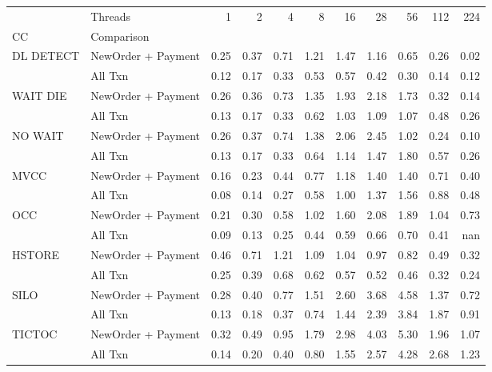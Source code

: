 \begin{tabular}{llrrrrrrrrr}
\toprule
       & Threads &  1   &  2   &  4   &  8   &  16  &  28  &  56  &  112 &  224 \\
CC & Comparison &      &      &      &      &      &      &      &      &      \\
\midrule
DL DETECT & NewOrder + Payment & 0.25 & 0.37 & 0.71 & 1.21 & 1.47 & 1.16 & 0.65 & 0.26 & 0.02 \\
       & All Txn & 0.12 & 0.17 & 0.33 & 0.53 & 0.57 & 0.42 & 0.30 & 0.14 & 0.12 \\
WAIT DIE & NewOrder + Payment & 0.26 & 0.36 & 0.73 & 1.35 & 1.93 & 2.18 & 1.73 & 0.32 & 0.14 \\
       & All Txn & 0.13 & 0.17 & 0.33 & 0.62 & 1.03 & 1.09 & 1.07 & 0.48 & 0.26 \\
NO WAIT & NewOrder + Payment & 0.26 & 0.37 & 0.74 & 1.38 & 2.06 & 2.45 & 1.02 & 0.24 & 0.10 \\
       & All Txn & 0.13 & 0.17 & 0.33 & 0.64 & 1.14 & 1.47 & 1.80 & 0.57 & 0.26 \\
MVCC & NewOrder + Payment & 0.16 & 0.23 & 0.44 & 0.77 & 1.18 & 1.40 & 1.40 & 0.71 & 0.40 \\
       & All Txn & 0.08 & 0.14 & 0.27 & 0.58 & 1.00 & 1.37 & 1.56 & 0.88 & 0.48 \\
OCC & NewOrder + Payment & 0.21 & 0.30 & 0.58 & 1.02 & 1.60 & 2.08 & 1.89 & 1.04 & 0.73 \\
       & All Txn & 0.09 & 0.13 & 0.25 & 0.44 & 0.59 & 0.66 & 0.70 & 0.41 &  nan \\
HSTORE & NewOrder + Payment & 0.46 & 0.71 & 1.21 & 1.09 & 1.04 & 0.97 & 0.82 & 0.49 & 0.32 \\
       & All Txn & 0.25 & 0.39 & 0.68 & 0.62 & 0.57 & 0.52 & 0.46 & 0.32 & 0.24 \\
SILO & NewOrder + Payment & 0.28 & 0.40 & 0.77 & 1.51 & 2.60 & 3.68 & 4.58 & 1.37 & 0.72 \\
       & All Txn & 0.13 & 0.18 & 0.37 & 0.74 & 1.44 & 2.39 & 3.84 & 1.87 & 0.91 \\
TICTOC & NewOrder + Payment & 0.32 & 0.49 & 0.95 & 1.79 & 2.98 & 4.03 & 5.30 & 1.96 & 1.07 \\
       & All Txn & 0.14 & 0.20 & 0.40 & 0.80 & 1.55 & 2.57 & 4.28 & 2.68 & 1.23 \\
\bottomrule
\end{tabular}
